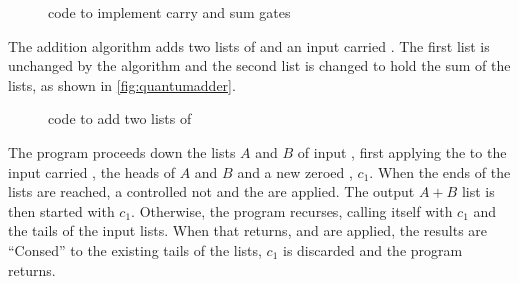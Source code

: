 \begin{figure}[htbp]

\caption{\lqpl{} code to implement carry and sum gates}\label{fig:carrysum}
\end{figure}

The addition algorithm adds two lists of \qbits{} and an input
carried \qbit. The first list
is unchanged by the algorithm and the second list is changed to hold the 
sum of the lists, as shown in \vref{fig:quantumadder}.

\begin{figure}[htbp]

\caption{\lqpl{} code to add two lists of \qbits}\label{fig:quantumadder}
\end{figure}

The program proceeds down the lists $A$ and $B$ of input \qbits, first applying
the  to the input carried \qbit, the heads of $A$ and $B$ and
a new zeroed \qbit, $c_1$. When the ends of the lists are reached, a controlled
not and the  are applied. The output $A+B$ list is then started
with $c_1$. Otherwise, the program recurses, calling itself
with $c_1$ and the tails of the input lists. When that returns, 
and  are applied, the results are ``Consed'' to the existing
tails of the lists, $c_1$ is discarded and the program returns.